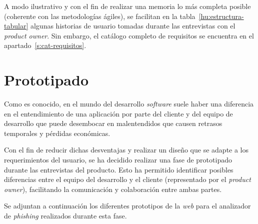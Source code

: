 A modo ilustrativo y con el fin de realizar una memoria lo más completa posible (coherente con las metodologías ágiles), se facilitan en la tabla~\ref{hu:estructura-tabular} algunas historias de usuario tomadas durante las entrevistas con el \textit{product owner}. Sin embargo, el catálogo completo de requisitos se encuentra en el apartado~\ref{s:cat-requisitos}.

\section{Prototipado}
\label{s:mockups}

Como es conocido, en el mundo del desarrollo \textit{software} suele haber una diferencia en el entendimiento de una aplicación por parte del cliente y del equipo de desarrollo que puede desembocar en malentendidos que causen retrasos temporales y pérdidas económicas.

Con el fin de reducir dichas desventajas y realizar un diseño que se adapte a los requerimientos del usuario, se ha decidido realizar una fase de prototipado durante las entrevistas del producto. Esto ha permitido identificar posibles diferencias entre el equipo del desarrollo y el cliente (representado por el \textit{product owner}), facilitando la comunicación y colaboración entre ambas partes.

Se adjuntan a continuación los diferentes prototipos de la \textit{web} para el analizador de \textit{phishing} realizados durante esta fase.


